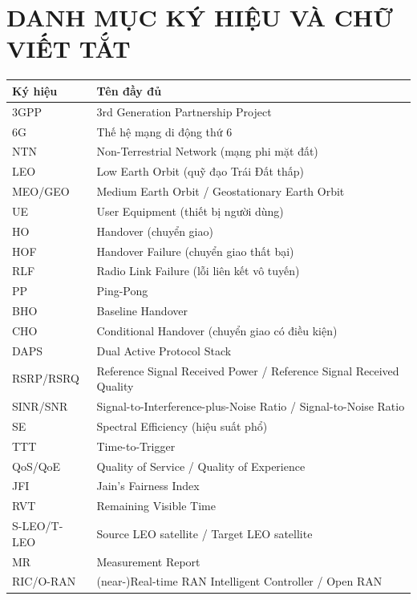 \section*{DANH MỤC KÝ HIỆU VÀ CHỮ VIẾT TẮT}
\begin{longtable}{|p{3.2cm}|p{11.3cm}|}
\hline
\textbf{Ký hiệu} & \textbf{Tên đầy đủ} \\
\hline
\endhead
3GPP & 3rd Generation Partnership Project \\
\hline
6G & Thế hệ mạng di động thứ 6 \\
\hline
NTN & Non-Terrestrial Network (mạng phi mặt đất) \\
\hline
LEO & Low Earth Orbit (quỹ đạo Trái Đất thấp) \\
\hline
MEO/\allowbreak GEO & Medium Earth Orbit / Geostationary Earth Orbit \\
\hline
UE & User Equipment (thiết bị người dùng) \\
\hline
HO & Handover (chuyển giao) \\
\hline
HOF & Handover Failure (chuyển giao thất bại) \\
\hline
RLF & Radio Link Failure (lỗi liên kết vô tuyến) \\
\hline
PP & Ping-Pong \\
\hline
BHO & Baseline Handover \\
\hline
CHO & Conditional Handover (chuyển giao có điều kiện) \\
\hline
DAPS & Dual Active Protocol Stack \\
\hline
RSRP/\allowbreak RSRQ & Reference Signal Received Power / Reference Signal Received Quality \\
\hline
SINR/\allowbreak SNR & Signal-to-Interference-plus-Noise Ratio / Signal-to-Noise Ratio \\
\hline
SE & Spectral Efficiency (hiệu suất phổ) \\
\hline
TTT & Time-to-Trigger \\
\hline
QoS/\allowbreak QoE & Quality of Service / Quality of Experience \\
\hline
JFI & Jain's Fairness Index \\
\hline
RVT & Remaining Visible Time \\
\hline
S-LEO/\allowbreak T-LEO & Source LEO satellite / Target LEO satellite \\
\hline
MR & Measurement Report \\
\hline
RIC/\allowbreak O-RAN & (near-)Real-time RAN Intelligent Controller / Open RAN \\

\end{longtable}
